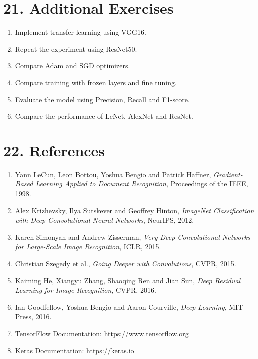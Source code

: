 \documentclass[11pt]{article}
\begin{document}
\section*{21. Additional Exercises}

\begin{enumerate}

\item Implement transfer learning using VGG16.

\item Repeat the experiment using ResNet50.

\item Compare Adam and SGD optimizers.

\item Compare training with frozen layers and fine tuning.

\item Evaluate the model using Precision, Recall and F1-score.

\item Compare the performance of LeNet, AlexNet and ResNet.

\end{enumerate}

\section*{22. References}

\begin{enumerate}

\item Yann LeCun, Leon Bottou, Yoshua Bengio and Patrick Haffner,
\emph{Gradient-Based Learning Applied to Document Recognition},
Proceedings of the IEEE, 1998.

\item Alex Krizhevsky, Ilya Sutskever and Geoffrey Hinton,
\emph{ImageNet Classification with Deep Convolutional Neural Networks},
NeurIPS, 2012.

\item Karen Simonyan and Andrew Zisserman,
\emph{Very Deep Convolutional Networks for Large-Scale Image Recognition},
ICLR, 2015.

\item Christian Szegedy et al.,
\emph{Going Deeper with Convolutions},
CVPR, 2015.

\item Kaiming He, Xiangyu Zhang, Shaoqing Ren and Jian Sun,
\emph{Deep Residual Learning for Image Recognition},
CVPR, 2016.

\item Ian Goodfellow, Yoshua Bengio and Aaron Courville,
\emph{Deep Learning},
MIT Press, 2016.

\item TensorFlow Documentation:
\url{https://www.tensorflow.org}

\item Keras Documentation:
\url{https://keras.io}

\end{enumerate}
\end{document}
